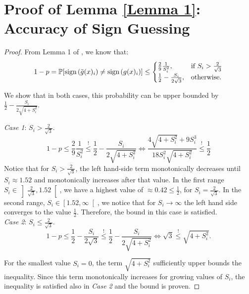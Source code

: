
\section{Proof of Lemma \ref{Lemma 1}: Accuracy of Sign Guessing}
\label{prooflemma}

\begin{proof}

\noindent From Lemma 1 of \cite{bernstein2018signsgd}, we know that:
\begin{equation*}
    1 - p = \mathbb{P}[\textnormal{sign}\left(\tilde{g}(x)_i\right) \neq \textnormal{sign}\left(g(x)_i\right)] \leq \begin{cases}
    \frac{2}{9}\frac{1}{S_i^2}, & \text{if } S_i > \frac{2}{\sqrt{3}} \\
    \frac{1}{2} - \frac{S_i}{2\sqrt{3}}, & \text{otherwise.}
    \end{cases}
\end{equation*}


We show that in both cases, this probability can be upper bounded by $\frac{1}{2} - \frac{S_i}{2\sqrt{4 + S_i^2}}$. 



\emph{Case 1}: $S_i > \frac{2}{\sqrt{3}}$.
\begin{equation*}
    1 - p \leq \frac{2}{9}\frac{1}{S_i^2} \overset{!}{\leq} \frac{1}{2} - \frac{S_i}{2\sqrt{4 + S_i^2}} \iff \frac{4\sqrt{4 + S_i^2} + 9S_i^3}{18S_i^2\sqrt{4 + S_i^2}} \overset{!}{\leq} \frac{1}{2}
\end{equation*}
Notice that for $S_i > \frac{2}{\sqrt{3}}$, the left hand-side term monotonically decreases until $S_i \approx 1.52$ and monotonically increases after that value. In the first range $S_i \in \left]\frac{2}{\sqrt{3}}, 1.52\right[$, we have a highest value of $\approx 0.42 \leq \frac{1}{2}$, for  $S_i = \frac{2}{\sqrt{3}}$. In the second range, $S_i \in \left[1.52, \infty\right[$, we notice that for $S_i \to \infty$ the left hand side converges to the value $\frac{1}{2}$. Therefore, the bound in this case is satisfied. \\
\emph{Case 2}: $S_i \leq \frac{2}{\sqrt{3}}$.
\begin{equation*}
    1 - p \leq \frac{1}{2} - \frac{S_i}{2\sqrt{3}} \overset{!}{\leq} \frac{1}{2} - \frac{S_i}{2\sqrt{4 + S_i^2}} \iff  \sqrt{3} \overset{!}{\leq} \sqrt{4 + S_i^2}.
\end{equation*}


For the smallest value $S_i  = 0$, the term $\sqrt{4 + S_i^2}$ sufficiently upper bounds the inequality. Since this term monotonically increases for growing values of $S_i$, the inequality is satisfied also in \textit{Case 2} and the bound is proven.



\end{proof}
